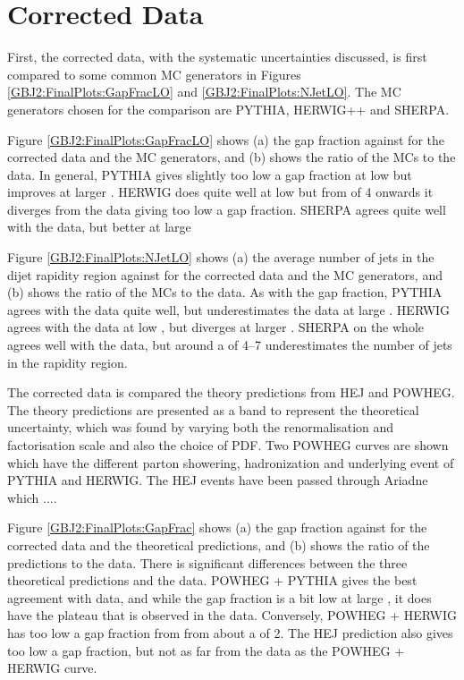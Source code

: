 \section{Corrected Data}
\label{sec:GBJ2:FinalPlots}

First, the corrected data, with the systematic uncertainties discussed, is first compared to some common MC generators in Figures \ref{GBJ2:FinalPlots:GapFracLO} and \ref{GBJ2:FinalPlots:NJetLO}.
The MC generators chosen for the comparison are PYTHIA, HERWIG++ and SHERPA. 

Figure \ref{GBJ2:FinalPlots:GapFracLO} shows (a) the gap fraction against \dy{} for the corrected data and the MC generators, and (b) shows the ratio of the MCs to the data.
In general, PYTHIA gives slightly too low a gap fraction at low \dy{} but improves at larger \dy{}. 
HERWIG does quite well at low \dy{} but from \dy{} of 4 onwards it diverges from the data giving too low a gap fraction. 
SHERPA agrees quite well with the data, but better at large \dy{}

Figure \ref{GBJ2:FinalPlots:NJetLO} shows (a) the average number of jets in the dijet rapidity region against \dy{} for the corrected data and the MC generators, and (b) shows the ratio of the MCs to the data.
As with the gap fraction, PYTHIA agrees with the data quite well, but underestimates the data at large \dy{}.
HERWIG agrees with the data at low \dy{}, but diverges at larger \dy{}.
SHERPA on the whole agrees well with the data, but around a \dy{} of 4--7 underestimates the number of jets in the rapidity region.

The corrected data is compared the theory predictions from HEJ and POWHEG. 
The theory predictions are presented as a band to represent the theoretical uncertainty, which was found by varying both the renormalisation and factorisation scale and also the choice of PDF.
Two POWHEG curves are shown which have the different parton showering, hadronization and underlying event of PYTHIA and HERWIG. 
The HEJ events have been passed through Ariadne which ....


Figure \ref{GBJ2:FinalPlots:GapFrac} shows (a) the gap fraction against \dy{} for the corrected data and the theoretical predictions, and (b) shows the ratio of the predictions to the data.
There is significant differences between the three theoretical predictions and the data.
POWHEG + PYTHIA gives the best agreement with data, and while the gap fraction is a bit low at large \dy{}, it does have the plateau that is observed in the data. 
Conversely, POWHEG + HERWIG has too low a gap fraction from from about a \dy{} of 2.
The HEJ prediction also gives too low a gap fraction, but not as far from the data as the POWHEG + HERWIG curve.

